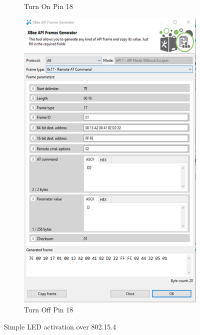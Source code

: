 \begin{figure}[h!]
\begin{subfigure}[t]{0.22\textwidth}
			\caption{Turn On Pin 18}
		\end{subfigure}
		\begin{subfigure}[t]{0.22\textwidth}
			\centering
			\includegraphics[width=\textwidth]{xbeeXctu1.png}
			\caption{Turn Off Pin 18}
		\end{subfigure}
		\caption{Simple LED activation over 802.15.4}
	\end{figure}
